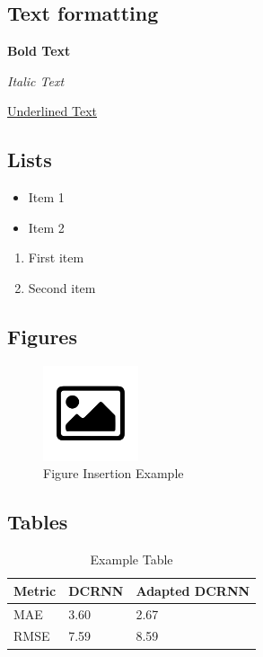 \subsection{Text formatting}\label{subsec:text-formatting}
\textbf{Bold Text}

\textit{Italic Text}

\underline{Underlined Text}

\subsection{Lists}\label{subsec:lists}
\begin{itemize}
    \item Item 1
    \item Item 2
\end{itemize}

\begin{enumerate}
    \item First item
    \item Second item
\end{enumerate}

\subsection{Figures}\label{subsec:figures}
\begin{figure}[htbp]
    \centering
    \includegraphics[width=0.25\textwidth]{images/default}
    \caption{
        Figure Insertion Example
    }
    \label{fig:figure-insertion-example}
\end{figure}

\subsection{Tables}\label{subsec:tables}
\begin{table}[htbp]
    \caption{
        Example Table
    }
    \center
    \begin{tabular}{@{}lll@{}}
        \toprule
        \textbf{Metric} & \textbf{DCRNN} & \textbf{Adapted DCRNN} \\
        \midrule
        MAE             & 3.60           & 2.67                   \\
        RMSE            & 7.59           & 8.59                   \\
        \bottomrule
    \end{tabular}
    \label{tab:example-table}
\end{table}

